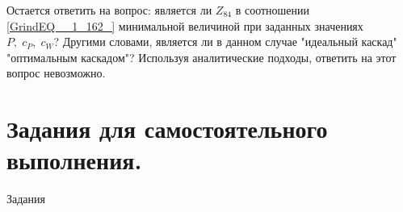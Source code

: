 Остается ответить на вопрос: является ли $Z_{84} $ в соотношении \ref{GrindEQ__1_162_} минимальной величиной при заданных значениях $P,\; c_{P} ,\; c_{W} $? Другими словами, является ли в данном случае "идеальный каскад" "оптимальным каскадом"? Используя аналитические подходы, ответить на этот вопрос невозможно.






\section{Задания для самостоятельного выполнения.}


Задания
